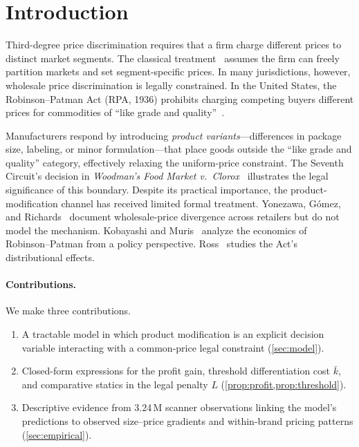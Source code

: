 \documentclass[11pt,a4paper]{article}
\theoremstyle{plain}
\theoremstyle{definition}
\theoremstyle{remark}
\begin{document}
\section{Introduction}\label{sec:intro}

Third-degree price discrimination requires that a firm charge different prices to distinct market segments.
The classical treatment~\cite{Pigou1920,Varian1989} assumes the firm can freely partition markets and set segment-specific prices.
In many jurisdictions, however, wholesale price discrimination is legally constrained.
In the United States, the Robinson--Patman Act (RPA, 1936) prohibits charging competing buyers different prices for commodities of ``like grade and quality''~\cite{FTC_RPA}.

Manufacturers respond by introducing \emph{product variants}---differences in package size, labeling, or minor formulation---that place goods outside the ``like grade and quality'' category, effectively relaxing the uniform-price constraint.
The Seventh Circuit's decision in \emph{Woodman's Food Market v.\ Clorox}~\cite{Woodmans2016} illustrates the legal significance of this boundary.
Despite its practical importance, the product-modification channel has received limited formal treatment.
Yonezawa, G\'omez, and Richards~\cite{Yonezawa2020} document wholesale-price divergence across retailers but do not model the mechanism.
Kobayashi and Muris~\cite{KobayashiMuris2026} analyze the economics of Robinson--Patman from a policy perspective.
Ross~\cite{CBSWinners} studies the Act's distributional effects.

\paragraph{Contributions.}
We make three contributions.
\begin{enumerate}[nosep,label=(\roman*)]
\item A tractable model in which product modification is an explicit decision variable interacting with a common-price legal constraint (\cref{sec:model}).
\item Closed-form expressions for the profit gain, threshold differentiation cost $\bar{k}$, and comparative statics in the legal penalty $L$ (\cref{prop:profit,prop:threshold}).
\item Descriptive evidence from 3.24\,M scanner observations linking the model's predictions to observed size--price gradients and within-brand pricing patterns (\cref{sec:empirical}).
\end{enumerate}
\end{document}
